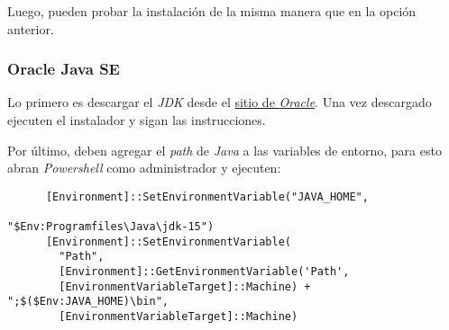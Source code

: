   Luego, pueden probar la instalación de la misma manera que en la opción anterior.

  \subsubsection{Oracle Java SE}
    Lo primero es descargar el \textit{JDK} desde el 
    \href{
      https://www.oracle.com/java/technologies/javase-jdk15-downloads.html
    }{sitio de \textit{Oracle}}. 
    Una vez descargado ejecuten el instalador y sigan las instrucciones.

    Por último, deben agregar el \textit{path} de \textit{Java} a las variables de 
    entorno, para esto abran \textit{Powershell} como administrador y ejecuten:

    \begin{verbatim}
      [Environment]::SetEnvironmentVariable("JAVA_HOME", 
                                            "$Env:Programfiles\Java\jdk-15")
      [Environment]::SetEnvironmentVariable(
        "Path", 
        [Environment]::GetEnvironmentVariable('Path', 
        [EnvironmentVariableTarget]::Machine) + ";$($Env:JAVA_HOME)\bin", 
        [EnvironmentVariableTarget]::Machine)
    \end{verbatim}